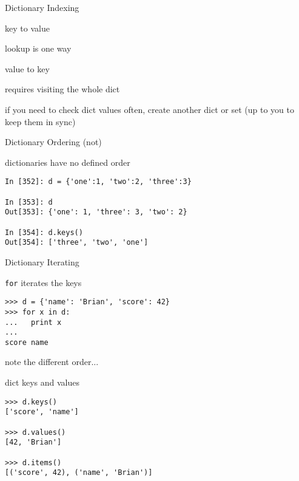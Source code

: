 \documentclass{beamer}
\begin{document}
\begin{frame}[fragile]{Dictionary Indexing}

\vfill
{\Large
{\center 

key to value

lookup is one way

}}
\vfill
{\Large
{\center 

value to key

requires visiting the whole dict

}}

\vfill
{\Large
if you need to check dict values often, create another dict or set (up to you to keep them in sync)

}
\vfill
\end{frame} 

\begin{frame}[fragile]{Dictionary Ordering (not)}

\vfill
{\Large
dictionaries have no defined order
}
\vfill
\begin{verbatim}
In [352]: d = {'one':1, 'two':2, 'three':3}

In [353]: d
Out[353]: {'one': 1, 'three': 3, 'two': 2}

In [354]: d.keys()
Out[354]: ['three', 'two', 'one']
\end{verbatim}
\vfill
\end{frame} 

\begin{frame}[fragile]{Dictionary Iterating}

{\Large \verb|for| iterates the keys}
\vfill
\begin{verbatim}
>>> d = {'name': 'Brian', 'score': 42}
>>> for x in d:
...   print x
...
score name
\end{verbatim}
\vfill
{note the different order...}
\end{frame}

\begin{frame}[fragile]{dict keys and values}

\vfill
\begin{verbatim}
>>> d.keys()
['score', 'name']

>>> d.values()
[42, 'Brian']

>>> d.items()
[('score', 42), ('name', 'Brian')]
\end{verbatim}
\vfill
\end{frame}
\end{document}
